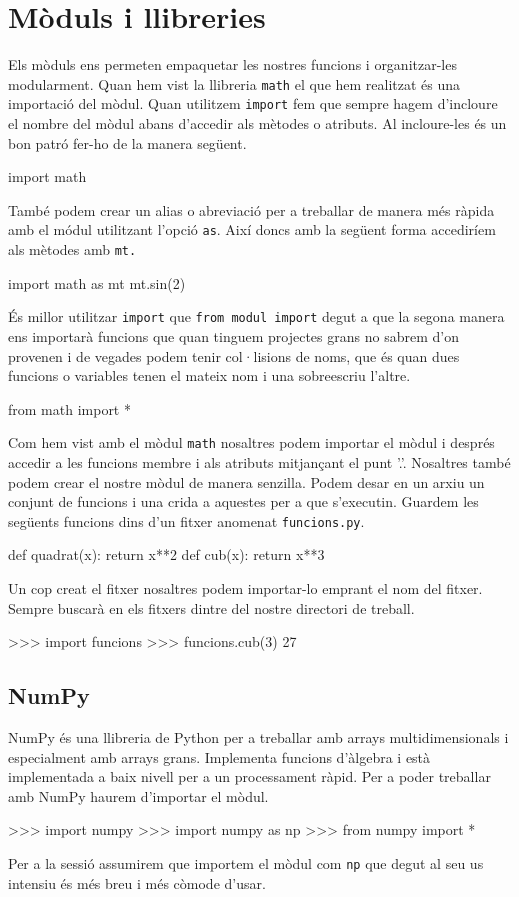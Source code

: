 \chapter{Mòduls i llibreries}
Els mòduls ens permeten empaquetar les nostres funcions i organitzar-les modularment. Quan hem vist la llibreria {\tt math} el que hem realitzat és una importació del mòdul. Quan utilitzem {\tt import} fem que sempre hagem d'incloure el nombre del mòdul abans d'accedir als mètodes o atributs. Al incloure-les és un bon patró fer-ho de la manera següent.

\begin{blockcode}
import math
\end{blockcode}

També podem crear un alias o abreviació per a treballar de manera més ràpida amb el módul utilitzant l'opció {\tt as}. Així doncs amb la següent forma accediríem als mètodes amb {\tt mt.} 

\begin{blockcode}
import math as mt
mt.sin(2)
\end{blockcode}

És millor utilitzar {\tt import} que {\tt from modul import} degut a que la segona manera ens importarà funcions que quan tinguem projectes grans no sabrem d'on provenen i de vegades podem tenir col·lisions de noms, que és quan dues funcions o variables tenen el mateix nom i una sobreescriu l'altre.

\begin{blockcode}
from math import *
\end{blockcode}

Com hem vist amb el mòdul {\tt math} nosaltres podem importar el mòdul i després accedir a les funcions membre i als atributs mitjançant el punt '.'. Nosaltres també podem crear el nostre mòdul de manera senzilla. Podem desar en un arxiu un conjunt de funcions i una crida a aquestes per a que s'executin. Guardem les següents funcions dins d'un fitxer anomenat {\tt funcions.py}.

\begin{blockcode}
def quadrat(x):
    return x**2
def cub(x):
    return x**3
\end{blockcode}
Un cop creat el fitxer nosaltres podem importar-lo emprant el nom del fitxer. Sempre buscarà en els fitxers dintre del nostre directori de treball. 
\begin{blockcode}
>>> import funcions
>>> funcions.cub(3)
27
\end{blockcode}
\section{NumPy}
NumPy és una llibreria de Python per a treballar amb arrays multidimensionals i especialment amb arrays grans. Implementa funcions d'àlgebra i està implementada a baix nivell per a un processament ràpid. Per a poder treballar amb NumPy haurem d'importar el mòdul.
\begin{blockcode}
>>> import numpy
>>> import numpy as np 
>>> from numpy import * 
\end{blockcode}
Per a la sessió assumirem que importem el mòdul com {\tt np} que degut al seu us intensiu és més breu i més còmode d'usar.

